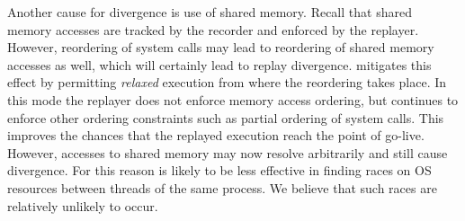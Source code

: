 Another cause for divergence is use of shared memory. Recall that
shared memory accesses are tracked by the recorder and enforced by the
replayer. However, reordering of system calls may lead to reordering
of shared memory accesses as well, which will certainly lead to replay
divergence. \racepro mitigates this effect by permitting \emph{relaxed}
execution from where the reordering takes place. In this mode the
replayer does not enforce memory access ordering, but continues to
enforce other ordering constraints such as partial ordering of system
calls. This improves the chances that the replayed execution reach the
point of go-live.  However, accesses to shared memory may
now resolve arbitrarily and still cause divergence. For this reason
\racepro is likely to be less effective in finding races on OS resources
between threads of the same process.  We believe that such races are
relatively unlikely to occur.

